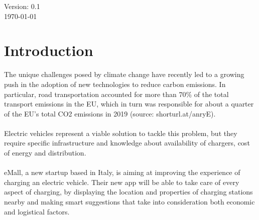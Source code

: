 \begin{titlepage}
	
	
	\vfill\vfill\vfill %
	    
    \large Version: 0.1
    \\
	{\large\today} %
	
	
	 
	
	\vfill %
	
\end{titlepage}

\section{Introduction}
The unique challenges posed by climate change have recently led to a growing push in the adoption of new technologies to reduce carbon emissions. In particular, road transportation accounted for more than 70\% of the total transport emissions in the EU, which in turn was responsible for about a quarter of the EU’s total CO2 emissions in 2019 (source: shorturl.at/anryE).
\\\\
Electric vehicles represent a viable solution to tackle this problem, but they require specific infrastructure and knowledge about availability of chargers, cost of energy and distribution.
\\\\
eMall, a new startup based in Italy, is aiming at improving the experience of charging an electric vehicle. Their new app will be able to take care of every aspect of charging, by displaying the location and properties of charging stations nearby and making smart suggestions that take into consideration both economic and logistical factors.

